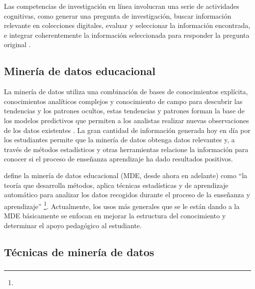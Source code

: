 Las competencias de investigación en línea involucran una serie de actividades cognitivas, como generar una pregunta de investigación, buscar información relevante en colecciones digitales, evaluar y seleccionar la información encontrada, e integrar coherentemente la información seleccionada para responder la pregunta original \parencite{eisenberg1990information}.

\subsection{Minería de datos educacional}
La minería de datos utiliza una combinación de bases de conocimientos explícita, conocimientos analíticos complejos y conocimiento de campo para descubrir las tendencias y los patrones ocultos, estas tendencias y patrones forman la base de los modelos predictivos que permiten a los analistas realizar nuevas observaciones de los datos existentes \parencite{luan2002data}. La gran cantidad de información generada hoy en día por los estudiantes permite que la minería de datos obtenga datos relevantes y, a través de métodos estadísticos y otras herramientas relacione la información para conocer si el proceso de enseñanza aprendizaje ha dado resultados positivos. 

\textcite[p.~9]{mining2012enhancing} define la minería de datos educacional (MDE, desde ahora en adelante) como “la teoría que desarrolla métodos, aplica técnicas estadísticas y de aprendizaje automático para analizar los datos recogidos durante el proceso de la enseñanza y aprendizaje” \footnote{\traduccionlibre}. Actualmente, los usos más generales que se le están dando a la MDE básicamente se enfocan en mejorar la estructura del conocimiento y determinar el apoyo pedagógico al estudiante.

\subsection{Técnicas de minería de datos}
\label{subsec:tecnicas-mineria}

\subsubsection*{}

\begin{figure}[H]
	\centering
	
	\label{fig:svm}
\end{figure}

